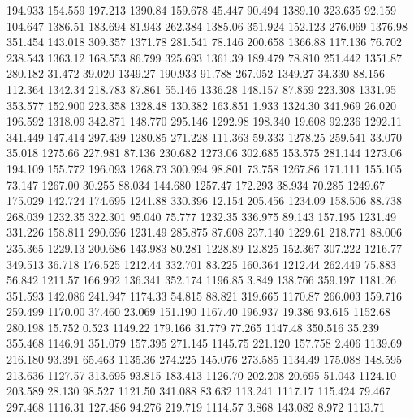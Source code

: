  194.933  154.559  197.213      1390.84
 159.678   45.447   90.494      1389.10
 323.635   92.159  104.647      1386.51
 183.694   81.943  262.384      1385.06
 351.924  152.123  276.069      1376.98
 351.454  143.018  309.357      1371.78
 281.541   78.146  200.658      1366.88
 117.136   76.702  238.543      1363.12
 168.553   86.799  325.693      1361.39
 189.479   78.810  251.442      1351.87
 280.182   31.472   39.020      1349.27
 190.933   91.788  267.052      1349.27
  34.330   88.156  112.364      1342.34
 218.783   87.861   55.146      1336.28
 148.157   87.859  223.308      1331.95
 353.577  152.900  223.358      1328.48
 130.382  163.851    1.933      1324.30
 341.969   26.020  196.592      1318.09
 342.871  148.770  295.146      1292.98
 198.340   19.608   92.236      1292.11
 341.449  147.414  297.439      1280.85
 271.228  111.363   59.333      1278.25
 259.541   33.070   35.018      1275.66
 227.981   87.136  230.682      1273.06
 302.685  153.575  281.144      1273.06
 194.109  155.772  196.093      1268.73
 300.994   98.801   73.758      1267.86
 171.111  155.105   73.147      1267.00
  30.255   88.034  144.680      1257.47
 172.293   38.934   70.285      1249.67
 175.029  142.724  174.695      1241.88
 330.396   12.154  205.456      1234.09
 158.506   88.738  268.039      1232.35
 322.301   95.040   75.777      1232.35
 336.975   89.143  157.195      1231.49
 331.226  158.811  290.696      1231.49
 285.875   87.608  237.140      1229.61
 218.771   88.006  235.365      1229.13
 200.686  143.983   80.281      1228.89
  12.825  152.367  307.222      1216.77
 349.513   36.718  176.525      1212.44
 332.701   83.225  160.364      1212.44
 262.449   75.883   56.842      1211.57
 166.992  136.341  352.174      1196.85
   3.849  138.766  359.197      1181.26
 351.593  142.086  241.947      1174.33
  54.815   88.821  319.665      1170.87
 266.003  159.716  259.499      1170.00
  37.460   23.069  151.190      1167.40
 196.937   19.386   93.615      1152.68
 280.198   15.752    0.523      1149.22
 179.166   31.779   77.265      1147.48
 350.516   35.239  355.468      1146.91
 351.079  157.395  271.145      1145.75
 221.120  157.758    2.406      1139.69
 216.180   93.391   65.463      1135.36
 274.225  145.076  273.585      1134.49
 175.088  148.595  213.636      1127.57
 313.695   93.815  183.413      1126.70
 202.208   20.695   51.043      1124.10
 203.589   28.130   98.527      1121.50
 341.088   83.632  113.241      1117.17
 115.424   79.467  297.468      1116.31
 127.486   94.276  219.719      1114.57
   3.868  143.082    8.972      1113.71
